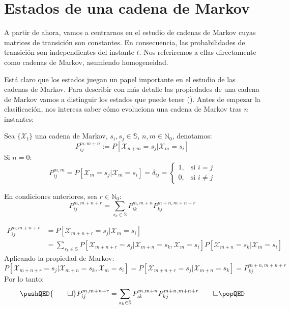 \section{Estados de una cadena de Markov}
A partir de ahora, vamos a centrarnos en el estudio de cadenas de Markov cuyas matrices de transición son constantes. En consecuencia, las probabilidades de transición son independientes del instante $t$. Nos referiremos a ellas directamente como cadenas de Markov, asumiendo homogeneidad. 

Está claro que los estados juegan un papel importante en el estudio de las cadenas de Markov. Para describir con más detalle las propiedades de una cadena de Markov vamos a distinguir los estados que puede tener (\cite{Barbosa}). Antes de empezar la clasificación, nos interesa saber cómo evoluciona una cadena de Markov tras $n$ instantes:


\begin{definition}
Sea $\{\mathcal{X}_t\}$ una cadena de Markov, $s_i, s_j \in \mathbb{S}$, $n,m\in\mathbb{N}_0$, denotamos:
\[P_{ij}^{m,m+n}:=P[\mathcal{X}_{n+m}=s_j|\mathcal{X}_m=s_i]\]
Si $n=0$:
\[P_{ij}^{m,m}=P[\mathcal{X}_{m}=s_j|\mathcal{X}_m=s_i]=\delta_{ij}=
\begin{cases}
    1, & \text{si } i=j\\
    0, &         \text{si } i\neq j
\end{cases}\]
\end{definition}
\begin{theorem}
En condiciones anteriores, sea $r\in \mathbb{N}_0$:
\[P_{ij}^{m,m+n+r}=\sum_{s_k\in\mathbb{S}}P_{ik}^{m,m+n}P_{kj}^{m+n,m+n+r}\]
\end{theorem}
\begin{proofs*}
    \[ 
    \begin{aligned}   
    P_{ij}^{m,m+n+r}&=P[\mathcal{X}_{m+n+r}=s_j|\mathcal{X}_m=s_i]\\
    &=\sum_{s_k\in\mathbb{S}} P[\mathcal{X}_{m+n+r}=s_j |\mathcal{X}_{m+n}=s_k,\mathcal{X}_m=s_i ] P[\mathcal{X}_{m+n}=s_k|\mathcal{X}_m=s_i ]
    \end{aligned} 
    \]
Aplicando la propiedad de Markov:
    \[P[\mathcal{X}_{m+n+r}=s_j |\mathcal{X}_{m+n}=s_k,\mathcal{X}_m=s_i ]=P[\mathcal{X}_{m+n+r}=s_j |\mathcal{X}_{m+n}=s_k]=P_{kj}^{m+n,m+n+r}\]
Por lo tanto:
    \[
    \pushQED{\qed}
    P_{ij}^{m,m+n+r}=\sum_{s_k\in\mathbb{S}}P_{ik}^{m,m+n}P_{kj}^{m+n,m+n+r}\qedhere
    \popQED\]
    
\end{proofs*}

